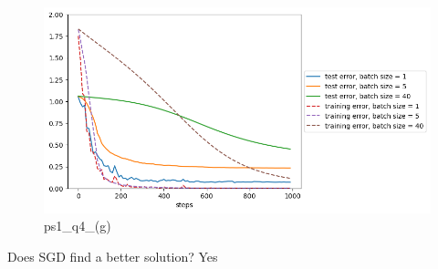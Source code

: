 
\begin{answer}
\begin{figure}
    \centering
    \includegraphics[width=0.5\linewidth]{implicitreg_quadratic_batchsize.png}
    \caption{ps1\_q4\_(g)}
    \label{fig:enter-label}
\end{figure}

Does SGD find a better solution? Yes

\end{answer}